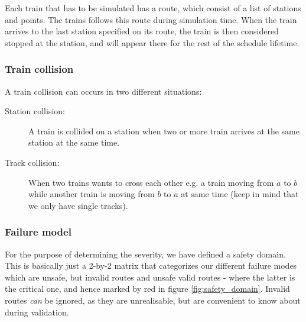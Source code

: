 \documentclass[10pt,a4paper]{article}
\begin{document}
Each train that has to be simulated has a route, which consist of a list of stations and points. The trains follows this route during simulation time. When the train arrives to the last station specified on its route, the train is then considered stopped at the station, and will appear there for the rest of the schedule lifetime.
 
\subsubsection{Train collision}
 
A train collision can occurs in two different situations:

\begin{description}

\item[Station collision:]
A train is collided on a station when two or more train arrives at the same station at the same time.
\item[Track collision:]
When two trains wants to cross each other e.g. a train moving from $a$ to $b$ while another train is moving from $b$ to $a$ at same time (keep in mind that we only have single tracks).
\end{description}

\subsubsection{Failure model}
For the purpose of determining the severity, we have defined a safety domain. This is basically just a 2-by-2 matrix that categorizes our different failure modes which are unsafe, but invalid routes and unsafe valid routes - where the latter is the critical one, and hence marked by red in figure \ref{fig:safety_domain}. Invalid routes \emph{can} be ignored, as they are unrealisable, but are convenient to know about during validation.
\end{document}
